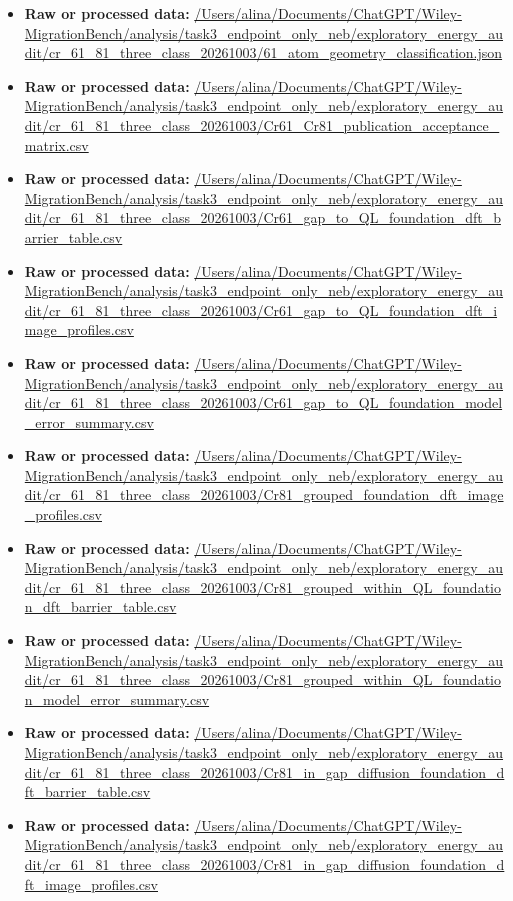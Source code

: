\begin{itemize}[leftmargin=1.4em,noitemsep]
\item \textbf{Raw or processed data:} \url{/Users/alina/Documents/ChatGPT/Wiley-MigrationBench/analysis/task3_endpoint_only_neb/exploratory_energy_audit/cr_61_81_three_class_20261003/61_atom_geometry_classification.json}
\item \textbf{Raw or processed data:} \url{/Users/alina/Documents/ChatGPT/Wiley-MigrationBench/analysis/task3_endpoint_only_neb/exploratory_energy_audit/cr_61_81_three_class_20261003/Cr61_Cr81_publication_acceptance_matrix.csv}
\item \textbf{Raw or processed data:} \url{/Users/alina/Documents/ChatGPT/Wiley-MigrationBench/analysis/task3_endpoint_only_neb/exploratory_energy_audit/cr_61_81_three_class_20261003/Cr61_gap_to_QL_foundation_dft_barrier_table.csv}
\item \textbf{Raw or processed data:} \url{/Users/alina/Documents/ChatGPT/Wiley-MigrationBench/analysis/task3_endpoint_only_neb/exploratory_energy_audit/cr_61_81_three_class_20261003/Cr61_gap_to_QL_foundation_dft_image_profiles.csv}
\item \textbf{Raw or processed data:} \url{/Users/alina/Documents/ChatGPT/Wiley-MigrationBench/analysis/task3_endpoint_only_neb/exploratory_energy_audit/cr_61_81_three_class_20261003/Cr61_gap_to_QL_foundation_model_error_summary.csv}
\item \textbf{Raw or processed data:} \url{/Users/alina/Documents/ChatGPT/Wiley-MigrationBench/analysis/task3_endpoint_only_neb/exploratory_energy_audit/cr_61_81_three_class_20261003/Cr81_grouped_foundation_dft_image_profiles.csv}
\item \textbf{Raw or processed data:} \url{/Users/alina/Documents/ChatGPT/Wiley-MigrationBench/analysis/task3_endpoint_only_neb/exploratory_energy_audit/cr_61_81_three_class_20261003/Cr81_grouped_within_QL_foundation_dft_barrier_table.csv}
\item \textbf{Raw or processed data:} \url{/Users/alina/Documents/ChatGPT/Wiley-MigrationBench/analysis/task3_endpoint_only_neb/exploratory_energy_audit/cr_61_81_three_class_20261003/Cr81_grouped_within_QL_foundation_model_error_summary.csv}
\item \textbf{Raw or processed data:} \url{/Users/alina/Documents/ChatGPT/Wiley-MigrationBench/analysis/task3_endpoint_only_neb/exploratory_energy_audit/cr_61_81_three_class_20261003/Cr81_in_gap_diffusion_foundation_dft_barrier_table.csv}
\item \textbf{Raw or processed data:} \url{/Users/alina/Documents/ChatGPT/Wiley-MigrationBench/analysis/task3_endpoint_only_neb/exploratory_energy_audit/cr_61_81_three_class_20261003/Cr81_in_gap_diffusion_foundation_dft_image_profiles.csv}

\end{itemize}
